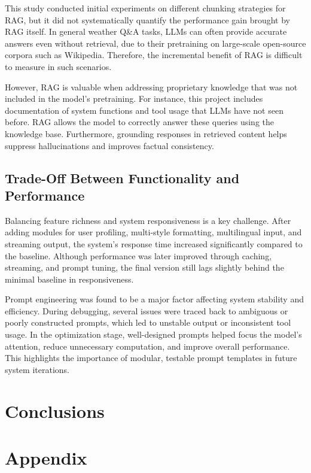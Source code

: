 \documentclass[final-report]{report-template}
\begin{document}
This study conducted initial experiments on different chunking strategies for RAG, but it did not systematically quantify the performance gain brought by RAG itself. In general weather Q\&A tasks, LLMs can often provide accurate answers even without retrieval, due to their pretraining on large-scale open-source corpora such as Wikipedia. Therefore, the incremental benefit of RAG is difficult to measure in such scenarios.

However, RAG is valuable when addressing proprietary knowledge that was not included in the model's pretraining. For instance, this project includes documentation of system functions and tool usage that LLMs have not seen before. RAG allows the model to correctly answer these queries using the knowledge base. Furthermore, grounding responses in retrieved content helps suppress hallucinations and improves factual consistency.

\subsection{Trade-Off Between Functionality and Performance}

Balancing feature richness and system responsiveness is a key challenge. After adding modules for user profiling, multi-style formatting, multilingual input, and streaming output, the system’s response time increased significantly compared to the baseline. Although performance was later improved through caching, streaming, and prompt tuning, the final version still lags slightly behind the minimal baseline in responsiveness.

Prompt engineering was found to be a major factor affecting system stability and efficiency. During debugging, several issues were traced back to ambiguous or poorly constructed prompts, which led to unstable output or inconsistent tool usage. In the optimization stage, well-designed prompts helped focus the model’s attention, reduce unnecessary computation, and improve overall performance. This highlights the importance of modular, testable prompt templates in future system iterations.





\section{Conclusions}






\newpage
\section{Appendix}




\newpage

\end{document}

